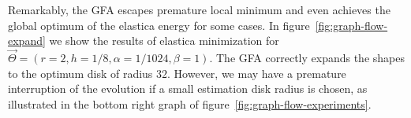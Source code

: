 \documentclass[smallextended]{svjour3}
\begin{document}
Remarkably, the GFA escapes premature local minimum and even achieves the global optimum of the elastica energy for some cases. In figure~\ref{fig:graph-flow-expand} we show the results of elastica minimization for $\vec{\Theta} = ( r=2,h=1/8,\alpha=1/1024,\beta=1 )$. The GFA correctly expands the shapes to the optimum disk of radius $32$. However, we may have a premature interruption of the evolution if a small estimation disk radius is chosen, as illustrated in the bottom right graph of figure~\ref{fig:graph-flow-experiments}.
%
%
\begin{figure}
\center
{}\hspace{1.5em}%
\hspace{1.5em}%

\end{figure}
\end{document}
